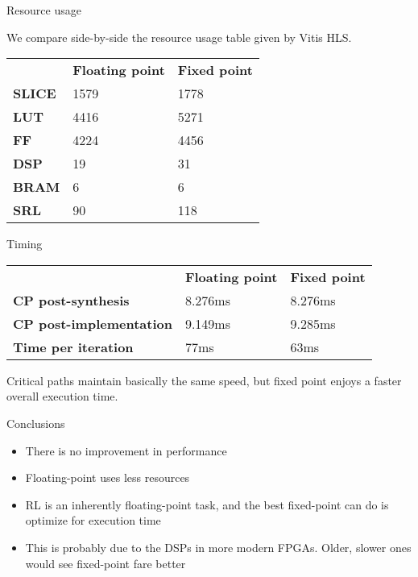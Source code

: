 \documentclass[10pt,xcolor={table,dvipsnames},t]{beamer}
\begin{document}
\begin{frame}{Resource usage}

We compare side-by-side the resource usage table given by Vitis HLS.

\begin{table}[]
\begin{tabular}{lll}
               & \textbf{Floating point} & \textbf{Fixed point} \\
\textbf{SLICE} & 1579                    & 1778                 \\
\textbf{LUT}   & 4416                    & 5271                 \\
\textbf{FF}    & 4224                    & 4456                 \\
\textbf{DSP}   & 19                      & 31                   \\
\textbf{BRAM}  & 6                       & 6                    \\
\textbf{SRL}   & 90                      & 118                 
\end{tabular}
\end{table}

\end{frame}

\begin{frame}{Timing}
\begin{table}[]
\begin{tabular}{lll}
                                & \textbf{Floating point} & \textbf{Fixed point} \\
\textbf{CP post-synthesis}      & 8.276ms                   & 8.276ms                \\
\textbf{CP post-implementation} & 9.149ms                 & 9.285ms \\
\textbf{Time per iteration} & 77ms & 63ms
\end{tabular}
\end{table}

Critical paths maintain basically the same speed, but fixed point enjoys a faster overall execution time.
\end{frame}

\begin{frame}{Conclusions}
    
    \begin{itemize}
        \item There is no improvement in performance
        \item Floating-point uses less resources
        \item RL is an inherently floating-point task, and the best fixed-point can do is optimize for execution time
        \item This is probably due to the DSPs in more modern FPGAs. Older, slower ones would see fixed-point fare better
    \end{itemize}
    
\end{frame}
\end{document}
